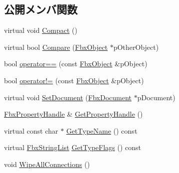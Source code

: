 \subsection*{公開メンバ関数}
\begin{DoxyCompactItemize}
\item 
virtual void \hyperlink{class_fbx_object_a2720f16a08150d162242b0c59f58c3dc}{Compact} ()
\item 
virtual bool \hyperlink{class_fbx_object_a49a593ea33e629adfac89c3238838144}{Compare} (\hyperlink{class_fbx_object}{Fbx\+Object} $\ast$p\+Other\+Object)
\item 
bool \hyperlink{class_fbx_object_affe87473b7a6485c7c7ad6e4184a0cad}{operator==} (const \hyperlink{class_fbx_object}{Fbx\+Object} \&p\+Object)
\item 
bool \hyperlink{class_fbx_object_a9bdaa7d7553dc65fde0138f0e60be723}{operator!=} (const \hyperlink{class_fbx_object}{Fbx\+Object} \&p\+Object)
\item 
virtual void \hyperlink{class_fbx_object_a5f01a45e03bbf2c243ae9ef71d9050cf}{Set\+Document} (\hyperlink{class_fbx_document}{Fbx\+Document} $\ast$p\+Document)
\item 
\hyperlink{class_fbx_property_handle}{Fbx\+Property\+Handle} \& \hyperlink{class_fbx_object_a779778f1761213ed413fa55c0b540d8e}{Get\+Property\+Handle} ()
\item 
virtual const char $\ast$ \hyperlink{class_fbx_object_a817dcfa8f7f7e2437324e1e71377c4b2}{Get\+Type\+Name} () const
\item 
virtual \hyperlink{class_fbx_string_list}{Fbx\+String\+List} \hyperlink{class_fbx_object_a6d30a5d00400039a248977cf9f9255b2}{Get\+Type\+Flags} () const
\item 
void \hyperlink{class_fbx_object_a57545454bba422674d78b805dca43409}{Wipe\+All\+Connections} ()
\end{DoxyCompactItemize}
